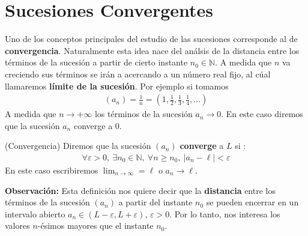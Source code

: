 \documentclass[12pt]{book}
\begin{document}
\section{Sucesiones Convergentes}
Uno de los conceptos principales del estudio de las sucesiones corresponde al de \textbf{convergencia}. Naturalmente esta idea nace del análsis de la distancia entre los términos de la sucesión a partir de cierto instante $n_0 \in \mathbb{N}$. A medida que $n$ va creciendo sus términos se irán a acercando a un número real fijo, al cúal llamaremos \textbf{límite de la sucesión}. Por ejemplo si tomamos
\begin{align*}
    (a_n)=\frac{1}{n}=\left(1, \frac{1}{2}, \frac{1}{3}, \frac{1}{4}, \ldots  \right)
\end{align*}
A medida que $n \to +\infty$ los términos de la sucesión $a_n \to 0$. En este caso diremos que la sucesión $a_n$ converge a $0$.
\begin{defi}{(Convergencia)}{}
    Diremos que la sucesión $(a_n)$ \textbf{converge} a $L$ si :
    \begin{align*}
        \forall \varepsilon>0, \ \exists n_0 \in \mathbb{N}, \ \forall n\geq n_0 , \ |a_n - \ell| < \varepsilon 
    \end{align*}
    En este caso escribiremos $\displaystyle \lim_{n \to \infty}=\ell$ o $a_n \to \ell$.
\end{defi}
\textbf{Observación:} Esta definición nos quiere decir que la \textbf{distancia} entre los términos de la sucesión $(a_n)$ a partir del instante $n_0$ se pueden encerrar en un intervalo abierto $a_n \in (L-\varepsilon, L+ \varepsilon)$, $\varepsilon >0$. Por lo tanto, nos interesa los valores $n$-ésimos mayores que el instante $n_0$.
\end{document}
